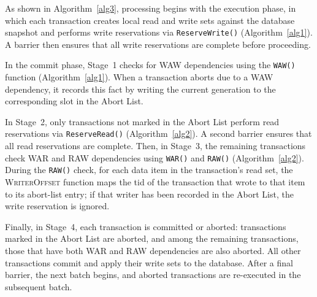 \documentclass[english,preprint,JIP]{ipsj}
\begin{document}
As shown in Algorithm~\ref{alg3}, processing begins with the execution phase, in which each transaction creates local read and write sets against the database snapshot and performs write reservations via \texttt{ReserveWrite()} (Algorithm~\ref{alg1}). A barrier then ensures that all write reservations are complete before proceeding.

In the commit phase, Stage~1 checks for WAW dependencies using the \texttt{WAW()} function (Algorithm~\ref{alg1}). When a transaction aborts due to a WAW dependency, it records this fact by writing the current generation to the corresponding slot in the Abort List.

In Stage~2, only transactions not marked in the Abort List perform read reservations via \texttt{ReserveRead()} (Algorithm~\ref{alg2}). A second barrier ensures that all read reservations are complete. Then, in Stage~3, the remaining transactions check WAR and RAW dependencies using \texttt{WAR()} and \texttt{RAW()} (Algorithm~\ref{alg2}). During the \texttt{RAW()} check, for each data item in the transaction's read set, the \textsc{WriterOffset} function maps the tid of the transaction that wrote to that item to its abort-list entry; if that writer has been recorded in the Abort List, the write reservation is ignored.

Finally, in Stage~4, each transaction is committed or aborted: transactions marked in the Abort List are aborted, and among the remaining transactions, those that have both WAR and RAW dependencies are also aborted. All other transactions commit and apply their write sets to the database. After a final barrier, the next batch begins, and aborted transactions are re-executed in the subsequent batch.
\end{document}

